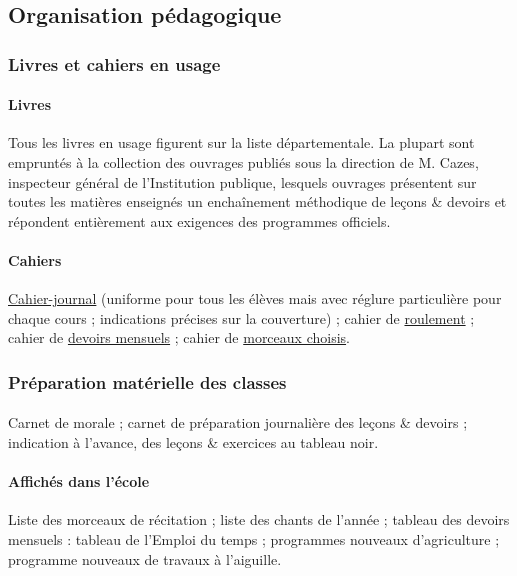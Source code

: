 \documentclass[../eBook.tex]{subfiles}
\begin{document}
  \subsection*{Organisation pédagogique}
    \subsubsection*{Livres et cahiers en usage}
      \paragraph{Livres}Tous les livres en usage figurent sur la liste départementale. La plupart sont empruntés à la collection des ouvrages publiés sous la direction de M. Cazes, inspecteur général de l'Institution publique, lesquels ouvrages présentent sur toutes les matières enseignés un enchaînement méthodique de leçons \& devoirs et répondent entièrement aux exigences des programmes officiels.
      \paragraph{Cahiers}\underline{Cahier-journal} (uniforme pour tous les élèves mais avec réglure particulière pour chaque cours ; indications précises sur la couverture) ; cahier de \underline{roulement} ; cahier de \underline{devoirs mensuels} ; cahier de \underline{morceaux choisis}.

    \subsubsection*{Préparation matérielle des classes}
      \paragraph{}Carnet de morale ; carnet de préparation journalière des leçons \& devoirs ; indication à l'avance, des leçons \& exercices au tableau noir.
      \paragraph{Affichés dans l'école}Liste des morceaux de récitation ; liste des chants de l'année ; tableau des devoirs mensuels : tableau de l'Emploi du temps ; programmes nouveaux d'agriculture ; programme nouveaux de travaux à l'aiguille.
\end{document}
